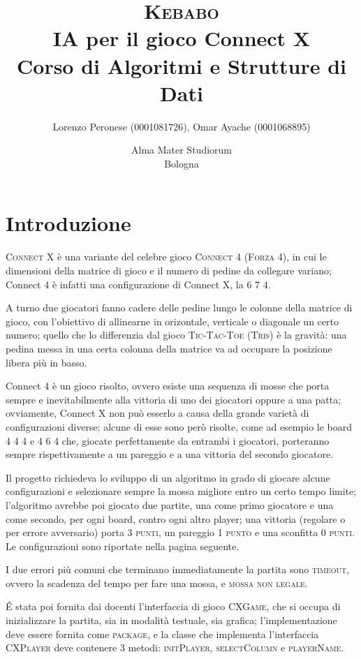 \documentclass{article}
\title{\textsc{Kebabo}\\
IA per il gioco Connect X\\
\large Corso di Algoritmi e Strutture di Dati}
\author{
  Lorenzo Peronese (0001081726),
  Omar Ayache (0001068895)
}
\date{
	Alma Mater Studiorum \\
    Bologna \\
  \displaydate{date}
}
\begin{document}
\maketitle
\thispagestyle{empty}
\pagebreak
{}
\tableofcontents
\pagebreak

\section{Introduzione}

\textsc{Connect X} è una variante del celebre gioco \textsc{Connect 4 (Forza 4)}, in cui le
dimensioni della matrice di gioco e il numero di pedine da collegare variano; 
Connect 4 è infatti una configurazione di Connect X, la \textsc{6 7 4}.

A turno due giocatori fanno cadere delle pedine lungo le colonne della 
matrice di gioco, con l'obiettivo di allinearne in orizontale, 
verticale o diagonale un certo numero; quello che lo differenzia 
dal gioco \textsc{Tic-Tac-Toe (Tris)} è la gravità: una pedina messa in una certa 
colonna della matrice va ad occupare la posizione libera più in basso.

Connect 4 è un gioco risolto, ovvero esiste una sequenza di mosse che 
porta sempre e inevitabilmente alla vittoria di uno dei giocatori oppure a una patta; ovviamente,
Connect X non può esserlo a causa della grande varietà di configurazioni diverse; 
alcune di esse sono però risolte, come ad esempio le board \textsc{4 4 4} e \textsc{4 6 4} che,
giocate perfettamente da entrambi i giocatori, porteranno sempre rispettivamente a un
pareggio e a una vittoria del secondo giocatore.

Il progetto richiedeva lo sviluppo di un algoritmo in grado di giocare 
alcune configurazioni e selezionare sempre la mossa migliore entro un certo tempo limite; 
l'algoritmo avrebbe poi giocato due partite, una come primo giocatore e una come secondo,
per ogni board, contro ogni altro player; una vittoria (regolare o per errore avversario) 
porta \textsc{3 punti}, un pareggio \textsc{1 punto} e una sconfitta 
\textsc{0 punti}.
Le configurazioni sono riportate nella pagina seguente.

I due errori più comuni che terminano immediatamente la partita sono \textsc{timeout}, 
ovvero la scadenza del tempo per fare una mossa, e \textsc{mossa non legale}.

\'E stata poi fornita dai docenti l'interfaccia di gioco \textsc{CXGame}, che si occupa di 
inizializzare la partita, sia in modalità testuale, sia grafica; l'implementazione deve
essere fornita come \textsc{package}, e la classe che implementa l'interfaccia \textsc{CXPlayer}
deve contenere 3 metodi: \textsc{initPlayer}, \textsc{selectColumn} e \textsc{playerName}. 
\end{document}

